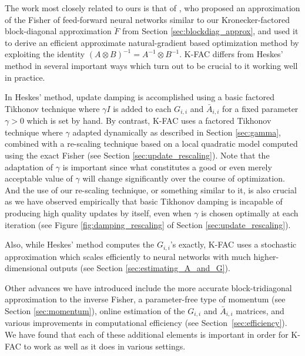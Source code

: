 \documentclass[12pt]{article}
\newcommand{\acronym}{K-FAC}
\begin{document}

The work most closely related to ours is that of \citet{heskes}, who proposed an approximation of the Fisher of feed-forward neural networks similar to our Kronecker-factored block-diagonal approximation $\breve{F}$ from Section \ref{sec:blockdiag_approx}, and used it to derive an efficient approximate natural-gradient based optimization method by exploiting the identity $(A \otimes B)^{-1} = A^{-1} \otimes B^{-1}$.  \acronym{} differs from Heskes' method in several important ways which turn out to be crucial to it working well in practice.  

In Heskes' method, update damping is accomplished using a basic factored Tikhonov technique where $\gamma I$ is added to each $G_{i,i}$ and $\bar{A}_{i,i}$ for a fixed parameter $\gamma > 0$ which is set by hand.  By contrast, \acronym{} uses a factored Tikhonov technique where $\gamma$ adapted dynamically as described in Section \ref{sec:gamma}, combined with a re-scaling technique based on a local quadratic model computed using the exact Fisher (see Section \ref{sec:update_rescaling}).  Note that the adaptation of $\gamma$ is important since what constitutes a good or even merely acceptable value of $\gamma$ will change significantly over the course of optimization.  And the use of our re-scaling technique, or something similar to it, is also crucial as we have observed empirically that basic Tikhonov damping is incapable of producing high quality updates by itself, even when $\gamma$ is chosen optimally at each iteration (see Figure \ref{fig:damping_rescaling} of Section \ref{sec:update_rescaling}).   

Also, while Heskes' method computes the $G_{i,i}$'s exactly, \acronym{} uses a stochastic approximation which scales efficiently to neural networks with much higher-dimensional outputs (see Section \ref{sec:estimating_A_and_G}).

Other advances we have introduced include the more accurate block-tridiagonal approximation to the inverse Fisher, a parameter-free type of momentum (see Section \ref{sec:momentum}), online estimation of the $G_{i,i}$ and $\bar{A}_{i,i}$ matrices, and various improvements in computational efficiency (see Section~\ref{sec:efficiency}).  We have found that each of these additional elements is important in order for \acronym{} to work as well as it does in various settings.
\end{document}
